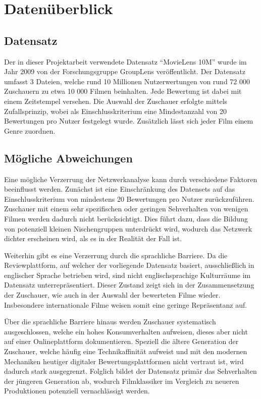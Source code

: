 \section{Datenüberblick}
\subsection{Datensatz}

Der in dieser Projektarbeit verwendete Datensatz \enquote{MovieLens 10M} wurde im Jahr 2009 von der Forschungsgruppe GroupLens veröffentlicht. \parencite{MovieLens10M}
Der Datensatz umfasst 3 Dateien, welche rund 10 Millionen Nutzerwertungen von rund 72 000 Zuschauern zu etwa 10 000 Filmen beinhalten.
Jede Bewertung ist dabei mit einem Zeitstempel versehen.
Die Auswahl der Zuschauer erfolgte  mittels Zufallsprinzip, wobei als Einschlusskriterium eine Mindestanzahl von 20 Bewertungen pro Nutzer festgelegt wurde.
Zusätzlich lässt sich jeder Film einem Genre zuordnen.

\subsection{Mögliche Abweichungen}

Eine mögliche Verzerrung der Netzwerkanalyse kann durch verschiedene Faktoren beeinflusst werden. 
Zunächst ist eine Einschränkung des Datensets auf das Einschlusskriterium von mindestens 20 Bewertungen pro Nutzer zurückzuführen.
Zuschauer mit einem sehr spezifischen oder geringen Sehverhalten von wenigen Filmen werden dadurch nicht berücksichtigt.
Dies führt dazu, dass die Bildung von potenziell kleinen Nischengruppen unterdrückt wird, wodurch das Netzwerk dichter erscheinen wird, als es in der Realität der Fall ist.


Weiterhin gibt es eine Verzerrung durch die sprachliche Barriere.
Da die Reviewplattform, auf welcher der vorliegende Datensatz basiert, ausschließlich in englischer Sprache betrieben wird, sind nicht englischsprachige Kulturräume im Datensatz unterrepräsentiert.
Dieser Zustand zeigt sich in der Zusammensetzung der Zuschauer, wie auch in der Auswahl der bewerteten Filme wieder. 
Insbesondere internationale Filme weisen somit eine geringe Repräsentanz auf.

Über die sprachliche Barriere hinaus werden Zuschauer systematisch ausgeschlossen, welche ein hohes Konsumverhalten aufweisen, dieses aber nicht auf einer Onlineplattform dokumentieren.
Speziell die ältere Generation der Zuschauer, welche häufig eine Technikaffinität aufweist und mit den modernen Mechaniken heutiger digitaler Bewertungsplattformen nicht vertraut ist, wird dadurch stark ausgegrenzt.
Folglich bildet der Datensatz primär das Sehverhalten der jüngeren Generation ab, wodurch Filmklassiker im Vergleich zu neueren Produktionen potenziell vernachlässigt werden.

